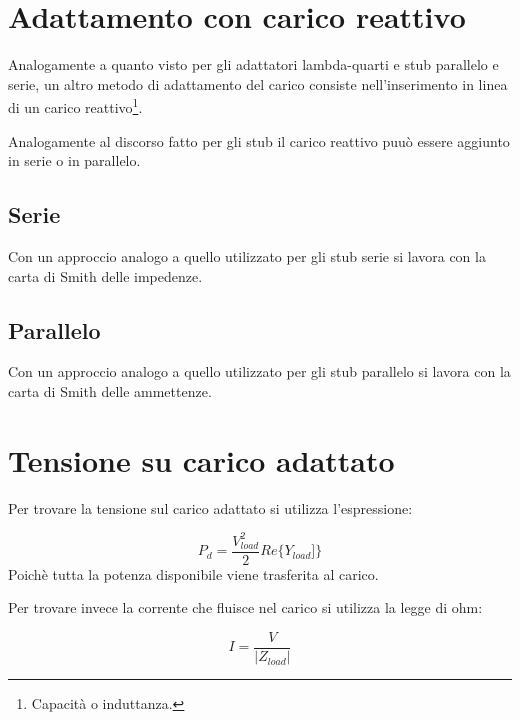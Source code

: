 	\section{Adattamento con carico reattivo}

		Analogamente a quanto visto per gli adattatori lambda-quarti e stub parallelo e serie, un altro metodo di adattamento del carico consiste nell'inserimento in linea di un carico reattivo\footnote{Capacità o induttanza.}.

		Analogamente al discorso fatto per gli stub il carico reattivo puuò essere aggiunto in serie o in parallelo.

		\subsection{Serie}
			Con un approccio analogo a quello utilizzato per gli stub serie si lavora con la carta di Smith delle impedenze.
		\subsection{Parallelo}
					Con un approccio analogo a quello utilizzato per gli stub parallelo si lavora con la carta di Smith delle ammettenze.

	\section{Tensione su carico adattato}

	Per trovare la tensione sul carico adattato si utilizza l'espressione:

	\begin{equation}
	P_d= \frac {V_{load}^2}{2} Re\{ Y_{load}] \}
	\end{equation}
	Poichè tutta la potenza disponibile viene trasferita al carico.

	Per trovare invece la corrente che fluisce nel carico si utilizza la legge di ohm:

	\begin{equation}
	I=\frac{V}{|Z_{load}|}
	\end{equation}